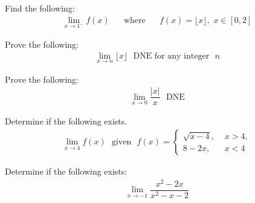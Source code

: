 \begin{exercise}
Find the following: 
\begin{align*}
    \lim_{x \longrightarrow 1^{-}} f(x) \hspace{20pt} \text{where} \hspace{20pt} f(x) = \lfloor x \rfloor,  \hspace{4pt} x \in [0, 2]
\end{align*}
\end{exercise}

\begin{exercise}
Prove the following:
\begin{align*}
    \lim_{x \longrightarrow n} \lfloor x \rfloor \hspace{8pt} \text{DNE for any integer} \hspace{8pt} n 
\end{align*}
\end{exercise}

\begin{exercise}
Prove the following:
\begin{align*}
    \lim_{x \longrightarrow 0} \dfrac{\lvert x \rvert}{x} \hspace{8pt} \text{DNE}
\end{align*}
\end{exercise}

\begin{exercise}
Determine if the following exists.
\begin{align*}
    \lim_{x \longrightarrow 4} f(x) \hspace{8pt} \text{given} \hspace{8pt} f(x) = 
    \begin{cases}
    \sqrt{x-4}, \hspace{4pt} &x > 4,\\[2ex]
    8-2x, \hspace{4pt} &x < 4
    \end{cases}
\end{align*}
\end{exercise}

\begin{exercise}
Determine if the following exists:
\begin{align*}
\lim_{x \longrightarrow -1} \dfrac{x^{2}-2x}{x^{2}-x-2}
\end{align*}
\end{exercise}

